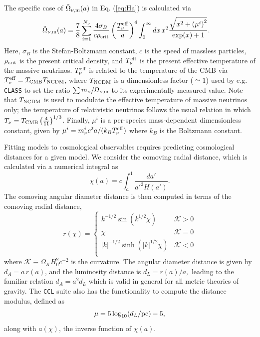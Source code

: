 \documentclass[\docopts]{\docclass}
\newcommand{\ccl}{{\tt CCL}\xspace}
\newcommand{\class}{{\tt CLASS}\xspace}
\begin{document}
The specific case of $\tilde\Omega_{\nu, {\rm m}}(a)$ in Eq. (\ref{eq:Ha}) is calculated via
\begin{align}
\tilde\Omega_{\nu, {\rm m}}(a) &= \frac{7}{8}\sum_{i=1}^{N_\nu} \frac{4 \sigma_{B}}{c \rho_{{\rm crit}}} \left(\frac{T_{\nu}^{\rm eff}}{a}\right)^4  \int_0^{\infty} dx \, x^2 \frac{\sqrt{x^2 + \left(\mu^i\right)^2}}{\exp(x) + 1}.
\label{Omnu}
\end{align}
Here, $\sigma_B$ is the Stefan-Boltzmann constant, $c$ is the speed of massless particles, $\rho_{{\rm crit}}$ is the present critical density, and $T_{\nu}^{\rm eff}$ is the present effective temperature of the massive neutrinos. $T_{\nu}^{\rm eff}$ is related to the temperature of the CMB via $T_{\nu}^{\rm eff} = T_{\rm CMB} T_{\rm NCDM}$, where $T_{\rm NCDM}$ is a dimensionless factor ($\simeq1$) used by e.g. \class to set the ratio ${\sum m_\nu}/{\Omega_{\nu, {\rm m}}}$ to its experimentally measured value. Note that $T_{\rm NCDM}$ is used to modulate the effective temperature of massive neutrinos only; the temperature of relativistic neutrinos follows the usual relation in which $T_\nu = T_{\rm CMB} \left(\frac{4}{11}\right)^{1/3}$. Finally, $\mu^i$ is a per-species mass-dependent dimensionless constant, given by $\mu^i = m_{\nu}^{i}c^2 a / (k_B T_{\nu}^{\rm eff})$ where $k_B$ is the Boltzmann constant.



Fitting models to cosmological observables requires predicting cosmological distances for a given model. We consider the comoving radial distance, which is calculated via a numerical integral as
\begin{equation}
 \chi(a)= c \int_a^1 \frac{da'}{a'^2 H(a')}.
 \label{eq:comrdist}
\end{equation}
The comoving angular diameter distance is then computed in terms of the comoving radial distance,
\begin{equation}\label{eq:angdist}
 r(\chi)=\left\{\begin{array}{cc}
                 k^{-1/2}\sin(k^{1/2}\chi) & \mathcal{K}>0\\
                 \chi & \mathcal{K}=0\\
                 |k|^{-1/2}\sinh(|k|^{1/2}\chi) & \mathcal{K}<0\\
                \end{array}\right.
\end{equation}
where $\mathcal{K} \equiv \Omega_K H_0^2 c^{-2}$ is the curvature.
The angular diameter distance is given by $d_A=a\,r(a)$, and the luminosity distance is
$d_L=r(a)/a,$ leading to the familiar relation $d_A = a^2d_L$ which is valid in general for all metric theories of gravity.
The \ccl suite also has the functionality to compute the distance modulus, defined as
\begin{equation}\label{eq:distmod}
    \mu = 5 \log_{10}(d_L / {\rm pc})-5,
\end{equation}
along with $a(\chi)$, the inverse function of $\chi(a)$.
\end{document}
